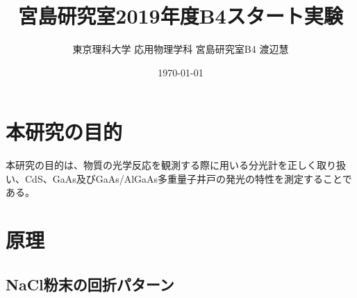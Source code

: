 \documentclass[11pt,a4j,uplatex]{jsarticle}
\title{宮島研究室2019年度B4スタート実験}
\author{東京理科大学 応用物理学科 宮島研究室B4 渡辺慧}
\date{\today}
\begin{document}
\maketitle %

\thispagestyle{empty}%
\clearpage
\addtocounter{page}{-1}

\newpage

\tableofcontents %

\thispagestyle{empty}%
\clearpage
\addtocounter{page}{-1}

\listoffigures%

\newpage
\section{本研究の目的}
本研究の目的は、物質の光学反応を観測する際に用いる分光計を正しく取り扱い、CdS、GaAs及びGaAs/AlGaAs多重量子井戸の発光の特性を測定することである。

\section{原理}
\subsection{NaCl粉末の回折パターン}
\end{document}
